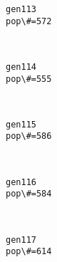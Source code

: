 \documentclass[11pt]{article}
\begin{document}
    \begin{Verbatim}[commandchars=\\\{\}]
gen113
pop\#=572

    \end{Verbatim}

    \begin{center}
    \end{center}
    { \hspace*{\fill} \\}
    
    \begin{Verbatim}[commandchars=\\\{\}]
gen114
pop\#=555

    \end{Verbatim}

    \begin{center}
    \end{center}
    { \hspace*{\fill} \\}
    
    \begin{Verbatim}[commandchars=\\\{\}]
gen115
pop\#=586

    \end{Verbatim}

    \begin{center}
    \end{center}
    { \hspace*{\fill} \\}
    
    \begin{Verbatim}[commandchars=\\\{\}]
gen116
pop\#=584

    \end{Verbatim}

    \begin{center}
    \end{center}
    { \hspace*{\fill} \\}
    
    \begin{Verbatim}[commandchars=\\\{\}]
gen117
pop\#=614

    \end{Verbatim}
\end{document}

